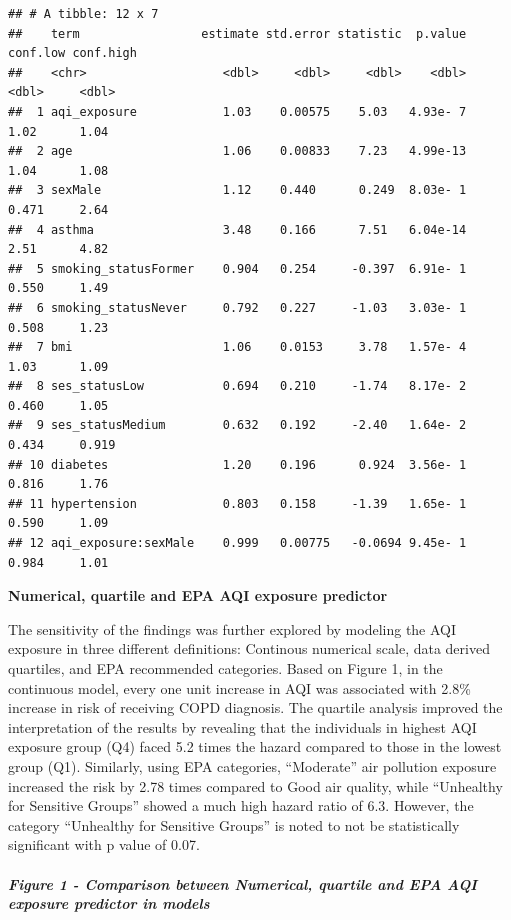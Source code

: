 \documentclass[
]{article}
\begin{document}
\begin{verbatim}
## # A tibble: 12 x 7
##    term                 estimate std.error statistic  p.value conf.low conf.high
##    <chr>                   <dbl>     <dbl>     <dbl>    <dbl>    <dbl>     <dbl>
##  1 aqi_exposure            1.03    0.00575    5.03   4.93e- 7    1.02      1.04 
##  2 age                     1.06    0.00833    7.23   4.99e-13    1.04      1.08 
##  3 sexMale                 1.12    0.440      0.249  8.03e- 1    0.471     2.64 
##  4 asthma                  3.48    0.166      7.51   6.04e-14    2.51      4.82 
##  5 smoking_statusFormer    0.904   0.254     -0.397  6.91e- 1    0.550     1.49 
##  6 smoking_statusNever     0.792   0.227     -1.03   3.03e- 1    0.508     1.23 
##  7 bmi                     1.06    0.0153     3.78   1.57e- 4    1.03      1.09 
##  8 ses_statusLow           0.694   0.210     -1.74   8.17e- 2    0.460     1.05 
##  9 ses_statusMedium        0.632   0.192     -2.40   1.64e- 2    0.434     0.919
## 10 diabetes                1.20    0.196      0.924  3.56e- 1    0.816     1.76 
## 11 hypertension            0.803   0.158     -1.39   1.65e- 1    0.590     1.09 
## 12 aqi_exposure:sexMale    0.999   0.00775   -0.0694 9.45e- 1    0.984     1.01
\end{verbatim}

\textbf{Numerical, quartile and EPA AQI exposure predictor}

The sensitivity of the findings was further explored by modeling the AQI
exposure in three different definitions: Continous numerical scale, data
derived quartiles, and EPA recommended categories. Based on Figure 1, in
the continuous model, every one unit increase in AQI was associated with
2.8\% increase in risk of receiving COPD diagnosis. The quartile
analysis improved the interpretation of the results by revealing that
the individuals in highest AQI exposure group (Q4) faced 5.2 times the
hazard compared to those in the lowest group (Q1). Similarly, using EPA
categories, ``Moderate'' air pollution exposure increased the risk by
2.78 times compared to Good air quality, while ``Unhealthy for Sensitive
Groups'' showed a much high hazard ratio of 6.3. However, the category
``Unhealthy for Sensitive Groups'' is noted to not be statistically
significant with p value of 0.07.

\paragraph{\texorpdfstring{\emph{Figure 1 - Comparison between
Numerical, quartile and EPA AQI exposure predictor in
models}}{Figure 1 - Comparison between Numerical, quartile and EPA AQI exposure predictor in models}}\label{figure-1---comparison-between-numerical-quartile-and-epa-aqi-exposure-predictor-in-models}
\end{document}
